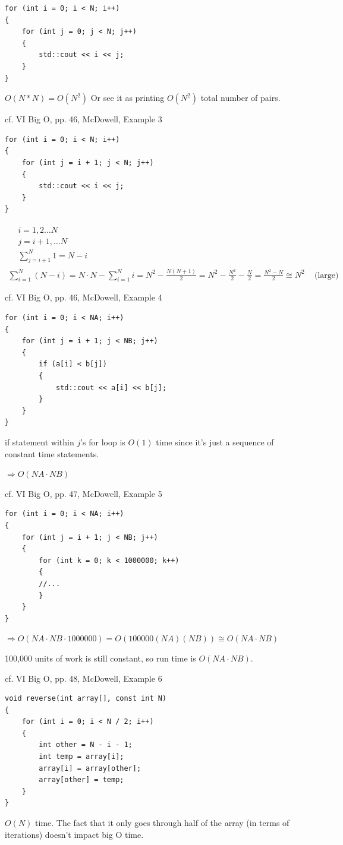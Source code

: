 \documentclass[10pt]{amsart}
\begin{document}
\begin{multicols*}{2}
\begin{verbatim}
for (int i = 0; i < N; i++)
{
	for (int j = 0; j < N; j++)
	{
		std::cout << i << j;
	}
}
\end{verbatim}

$O(N*N)= O(N^2)$ Or see it as printing $O(N^2)$ total number of pairs.

cf. VI Big O, pp. 46, McDowell, Example 3
\begin{verbatim}
for (int i = 0; i < N; i++)
{
	for (int j = i + 1; j < N; j++)
	{
		std::cout << i << j;
	}
}
\end{verbatim}
\[
\begin{gathered}
	\begin{aligned}
	& i = 1, 2 \dots N \\
	& j = i+1, \dots N \\
	& \sum_{j=i+1}^N 1 = N-i 
	\end{aligned} \\
\sum_{i=1}^N (N-i) = N\cdot N  - \sum_{i=1}^N i = N^2 - \frac{N(N+1)}{2} = N^2 - \frac{N^2}{2} - \frac{N}{2} = \frac{N^2 - N}{2} \cong N^2 \quad \, \text{(large)}
\end{gathered}
\]

cf. VI Big O, pp. 46, McDowell, Example 4
\begin{verbatim}
for (int i = 0; i < NA; i++)
{
	for (int j = i + 1; j < NB; j++)
	{
		if (a[i] < b[j])
		{
			std::cout << a[i] << b[j];
		}
	}
}
\end{verbatim}
if statement within $j$'s for loop is $O(1)$ time since it's just a sequence of constant time statements.

$\Longrightarrow O(NA \cdot NB)$

cf. VI Big O, pp. 47, McDowell, Example 5

\begin{verbatim}
for (int i = 0; i < NA; i++)
{
	for (int j = i + 1; j < NB; j++)
	{
		for (int k = 0; k < 1000000; k++) 
		{
		//...
		}
	}
}
\end{verbatim}

$\Longrightarrow O(NA \cdot NB \cdot 1000000) = O(100000 (NA)(NB)) \cong O(NA\cdot NB)$

100,000 units of work is still constant, so run time is $O(NA\cdot NB)$.

cf. VI Big O, pp. 48, McDowell, Example 6

\begin{verbatim}
void reverse(int array[], const int N)
{
	for (int i = 0; i < N / 2; i++)
	{
		int other = N - i - 1;
		int temp = array[i];
		array[i] = array[other];
		array[other] = temp;
	}
}
\end{verbatim}
$O(N)$ time. The fact that it only goes through half of the array (in terms of iterations) doesn't impact big O time.


\end{multicols*}
\end{document}
